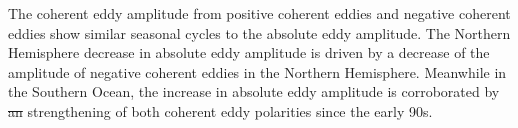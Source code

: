 \documentclass[draft,linenumbers]{agujournal2019}
\providecommand{\DIFadd}[1]{{\protect\color{blue}\uwave{#1}}} %
\providecommand{\DIFdel}[1]{{\protect\color{red}\sout{#1}}}                      %
\providecommand{\DIFaddbegin}{} %
\providecommand{\DIFaddend}{} %
\providecommand{\DIFdelbegin}{} %
\providecommand{\DIFdelend}{} %
\begin{document}
\DIFdelend The coherent eddy amplitude from positive coherent eddies and negative coherent eddies show similar seasonal cycles to the absolute eddy amplitude.
	The Northern Hemisphere decrease in absolute eddy amplitude is driven by a decrease of the amplitude of negative coherent eddies in the Northern Hemisphere. 
	Meanwhile in the Southern Ocean, the increase in absolute eddy amplitude is corroborated by \DIFdelbegin \DIFdel{an }\DIFdelend \DIFaddbegin \DIFadd{a }\DIFaddend strengthening of both coherent eddy polarities since the early 90s. 
\end{document}
